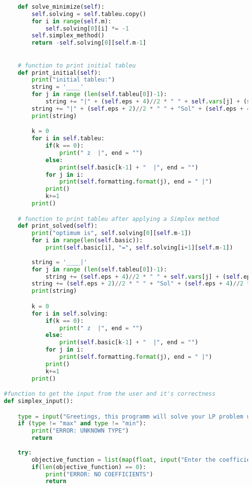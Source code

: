\documentclass[12pt, legalpaper]{exam}
\begin{document}
\begin{lstlisting}[language=Python, caption=Программа на Python, label=lst:python-code]
    
    def solve_minimize(self): 
        self.solving = self.tableu.copy()
        for i in range(self.m):
            self.solving[0][i] *= -1
        self.simplex_method()
        return -self.solving[0][self.m-1]

    
    # function to print initial tableu
    def print_initial(self):
        print("initial tableu:")
        string = '____'
        for j in range (len(self.tableu[0])-1):
            string += "|" + (self.eps + 4)//2 * " " + self.vars[j] + (self.eps + 4)//2 * " "
        string += "|" + (self.eps + 2)//2 * " " + "Sol" + (self.eps + 4)//2 * " " + "|"
        print(string)

        k = 0
        for i in self.tableu:
            if(k == 0):
                print(" z  |", end = "")
            else:
                print(self.basic[k-1] + "  |", end = "")
            for j in i:
                print(self.formatting.format(j), end = " |")
            print()
            k+=1
        print()

    # function to print tableu after applying a Simplex method
    def print_solved(self):
        print("optimum is", self.solving[0][self.m-1])
        for i in range(len(self.basic)):
            print(self.basic[i], "=", self.solving[i+1][self.m-1])
            
        string = '____|'
        for j in range (len(self.tableu[0])-1):
            string += (self.eps + 4)//2 * " " + self.vars[j] + (self.eps + 4)//2 * " " + "|"
        string += (self.eps + 2)//2 * " " + "Sol" + (self.eps + 4)//2 * " " + "|"
        print(string)

        k = 0
        for i in self.solving:
            if(k == 0):
                print(" z  |", end = "")
            else:
                print(self.basic[k-1] + "  |", end = "")
            for j in i:
                print(self.formatting.format(j), end = " |")
            print()
            k+=1
        print()

#function to get the input from the user and it's correctness
def simplex_input():

    type = input("Greetings, this programm will solve your LP problem using Simplex method.\nEnter the type of the problem(Max/Min): ").lower()
    if (type != "max" and type != "min"):
        print("ERROR: UNKNOWN TYPE")
        return
    
    try:
        objective_function = list(map(float, input("Enter the coefficients of the objective function: ").split(" ")))
        if(len(objective_function) == 0):
            print("ERROR: NO COEFFICIENTS")
            return
        

\end{lstlisting}
\end{document}
